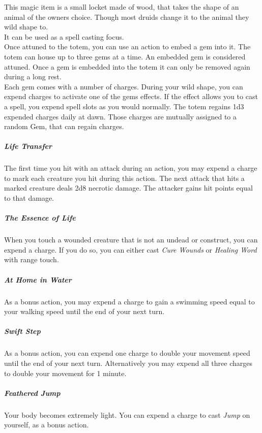 \documentclass[letter,10pt,twocolumn,openany]{dndbook}
\begin{document}

This magic item is a small locket made of wood, that takes the shape of an animal of the owners choice.
Though most druids change it to the animal they wild shape to.\\

It can be used as a spell casting focus.\\

Once attuned to the totem, you can use an action to embed a gem into it.
The totem can house up to three gems at a time.
An embedded gem is considered attuned.
Once a gem is embedded into the totem it can only be removed again during a long rest.\\

Each gem comes with a number of charges.
During your wild shape, you can expend charges to activate one of the gems effects.
If the effect allows you to cast a spell, you expend spell slots as you would normally.
The totem regains 1d3 expended charges daily at dawn.
Those charges are mutually assigned to a random Gem, that can regain charges.

\pagebreak


\subparagraph{Life Transfer}
The first time you hit with an attack during an action, you may expend a charge to mark each creature you hit during this action.
The next attack that hits a marked creature deals 2d8 necrotic damage.
The attacker gains hit points equal to that damage.

\subparagraph{The Essence of Life}
When you touch a wounded creature that is not an undead or construct, you can expend a charge.
If you do so, you can either cast \textit{Cure Wounds} or \textit{Healing Word} with range touch.

\subparagraph{At Home in Water}
As a bonus action, you may expend a charge to gain a swimming speed equal to your walking speed until the end of your next turn.


\subparagraph{Swift Step}
As a bonus action, you can expend one charge to double your movement speed until the end of your next turn.
Alternatively you may expend all three charges to double your movement for 1 minute.

\subparagraph{Feathered Jump}
Your body becomes extremely light.
You can expend a charge to cast \textit{Jump} on yourself, as a bonus action.
\end{document}
